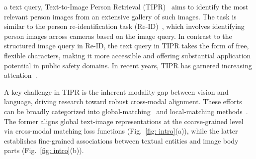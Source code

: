 \documentclass[10pt,journal,compsoc]{IEEEtran}
\begin{document}
 a text query, Text-to-Image Person Retrieval (TIPR)~\cite{li2017person} aims to identify the most relevant person images from an extensive gallery of such images. The task is similar to the person re-identification task (Re-ID)~\cite{he2021transreid, luo2019bag, wang2022nformer}, which involves identifying person images across cameras based on the image query. In contrast to the structured image query in Re-ID, the text query in TIPR takes the form of free, flexible characters, making it more accessible and offering substantial application potential in public safety domains. In recent years, TIPR has garnered increasing attention~\cite{jiang2023cross, bai2023rasa, cao2024empirical, zuo2024ufinebench, tan2024harnessing}.


A key challenge in TIPR is the inherent modality gap between vision and language, driving research toward robust cross-modal alignment.
These efforts can be broadly categorized into global-matching~\cite{zhang2018deep, zheng2020dual, chen2018improving, wang2019language}\cite{shu2022see,wu2023refined,liu2025dm} and local-matching methods~\cite{chen2022tipcb, ding2021semantically, jing2020pose, wang2020vitaa}\cite{you2025diverse}. 
The former aligns global text-image representations at the coarse-grained level via cross-modal matching loss functions (Fig.~\ref{fig: intro}(a)), while the latter establishes fine-grained associations between textual entities and image body parts (Fig.~\ref{fig: intro}(b)).
\end{document}
